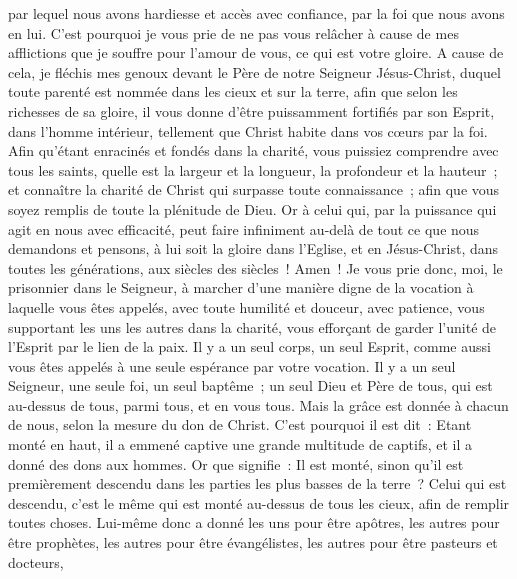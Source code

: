 \begin{multicols}{2}
par lequel nous avons hardiesse et accès avec confiance, par la foi que nous avons en lui.
C'est pourquoi je vous prie de ne pas vous relâcher à cause de mes afflictions que je souffre pour l'amour de vous, ce qui est votre gloire.
A cause de cela, je fléchis mes genoux devant le Père de notre Seigneur Jésus-Christ,
duquel toute parenté est nommée dans les cieux et sur la terre,
afin que selon les richesses de sa gloire, il vous donne d'être puissamment fortifiés par son Esprit, dans l'homme intérieur,
tellement que Christ habite dans vos cœurs par la foi. Afin qu'étant enracinés et fondés dans la charité,
vous puissiez comprendre avec tous les saints, quelle est la largeur et la longueur, la profondeur et la hauteur~;
et connaître la charité de Christ qui surpasse toute connaissance~; afin que vous soyez remplis de toute la plénitude de Dieu.
Or à celui qui, par la puissance qui agit en nous avec efficacité, peut faire infiniment au-delà de tout ce que nous demandons et pensons,
à lui soit la gloire dans l'Eglise, et en Jésus-Christ, dans toutes les générations, aux siècles des siècles~! Amen~!
\VerseOne{}Je vous prie donc, moi, le prisonnier dans le Seigneur, à marcher d'une manière digne de la vocation à laquelle vous êtes appelés,
avec toute humilité et douceur, avec patience, vous supportant les uns les autres dans la charité,
vous efforçant de garder l'unité de l'Esprit par le lien de la paix.
Il y a un seul corps, un seul Esprit, comme aussi vous êtes appelés à une seule espérance par votre vocation.
Il y a un seul Seigneur, une seule foi, un seul baptême~;
un seul Dieu et Père de tous, qui est au-dessus de tous, parmi tous, et en vous tous.
Mais la grâce est donnée à chacun de nous, selon la mesure du don de Christ.
C'est pourquoi il est dit~: Etant monté en haut, il a emmené captive une grande multitude de captifs, et il a donné des dons aux hommes.
Or que signifie~: Il est monté, sinon qu'il est premièrement descendu dans les parties les plus basses de la terre~?
Celui qui est descendu, c'est le même qui est monté au-dessus de tous les cieux, afin de remplir toutes choses.
Lui-même donc a donné les uns pour être apôtres, les autres pour être prophètes, les autres pour être évangélistes, les autres pour être pasteurs et docteurs,

\end{multicols}

